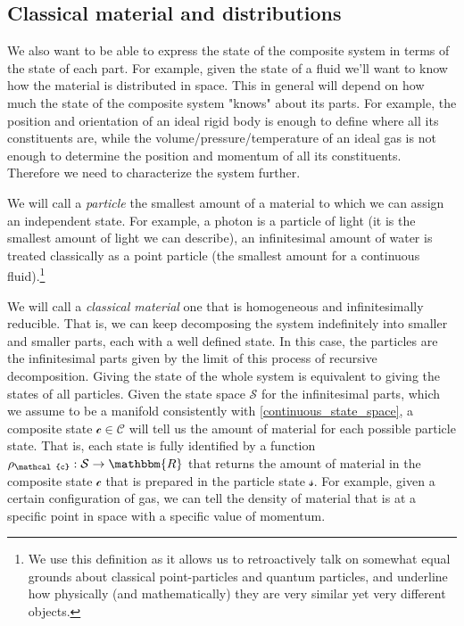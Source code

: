 \documentclass[aps,pra,10pt,twocolumn,floatfix,nofootinbib]{revtex4-1}
\numberwithin{equation}{section}
\theoremstyle{definition}
\begin{document}
\subsection{Classical material and distributions}
We also want to be able to express the state of the composite system in terms of the state of each part. For example, given the state of a fluid we'll want to know how the material is distributed in space. This in general will depend on how much the state of the composite system "knows" about its parts. For example, the position and orientation of an ideal rigid body is enough to define where all its constituents are, while the volume/pressure/temperature of an ideal gas is not enough to determine the position and momentum of all its constituents. Therefore we need to characterize the system further.

We will call a \emph{particle} the smallest amount of a material to which we can assign an independent state. For example, a photon is a particle of light (it is the smallest amount of light we can describe), an infinitesimal amount of water is treated classically as a point particle (the smallest amount for a continuous fluid).\footnote{We use this definition as it allows us to retroactively talk on somewhat equal grounds about classical point-particles and quantum particles, and underline how physically (and mathematically) they are very similar yet very different objects.}

We will call a \emph{classical material} one that is homogeneous and infinitesimally reducible. That is, we can keep decomposing the system indefinitely into smaller and smaller parts, each with a well defined state. In this case, the particles are the infinitesimal parts given by the limit of this process of recursive decomposition. Giving the state of the whole system is equivalent to giving the states of all particles. Given the state space $\mathcal{S}$ for the infinitesimal parts, which we assume to be a manifold consistently with \ref{continuous_state_space}, a composite state $\mathcal{c} \in \mathcal{C}$ will tell us the amount of material for each possible particle state. That is, each state is fully identified by a function $\rho_\mathcal{c}: \mathcal{S} \to \mathbbm{R}$ that returns the amount of material in the composite state $\mathcal{c}$ that is prepared in the particle state $\mathcal{s}$. For example, given a certain configuration of gas, we can tell the density of material that is at a specific point in space with a specific value of momentum.
\end{document}
